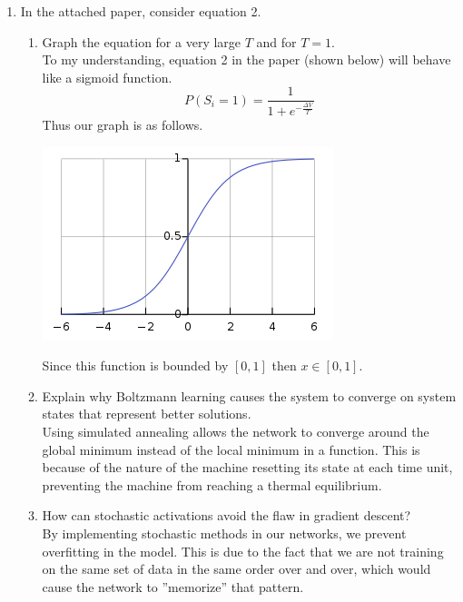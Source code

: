 \documentclass[notitlepage]{report}
\theoremstyle{plain} %
\theoremstyle{definition} %
\theoremstyle{plain} %
\begin{document}
\begin{enumerate}
\item In the attached paper, consider equation 2.
	\begin{enumerate}
	\item Graph the equation for a very large $T$ and for $T=1$.
	\medskip\\
		To my understanding, equation 2 in the paper (shown below) will behave like a sigmoid function.
		\[ P(S_i = 1) = \dfrac{1}{1+e^{-\frac{\Delta V}{T}}} \]
		Thus our graph is as follows.\\
		\begin{center}
		\includegraphics[scale=0.5]{sigmoid.png}
		\end{center}
		Since this function is bounded by $[0,1]$ then $x\in [0,1]$.
	
	\item Explain why Boltzmann learning causes the system to converge on system states that represent better solutions.
	\medskip\\
		Using simulated annealing allows the network to converge around the global minimum instead of the local minimum in a function. This is because of the nature of the machine resetting its state at each time unit, preventing the machine from reaching a thermal equilibrium.
		
	\item How can stochastic activations avoid the flaw in gradient descent?
	\medskip\\
		By implementing stochastic methods in our networks, we prevent overfitting in the model. This is due to the fact that we are not training on the same set of data in the same order over and over, which would cause the network to ''memorize'' that pattern.
	\end{enumerate}
\end{enumerate}
\end{document}
